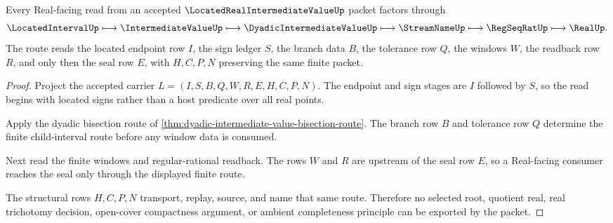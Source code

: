 \begin{theorem}
\label{thm:located-real-intermediate-value-sign-branch-route}
Every Real-facing read from an accepted $\LocatedRealIntermediateValueUp$ packet factors through
$$
\LocatedIntervalUp \longmapsto \IntermediateValueUp \longmapsto \DyadicIntermediateValueUp \longmapsto \StreamNameUp \longmapsto \RegSeqRatUp \longmapsto \RealUp .
$$
The route reads the located endpoint row $I$, the sign ledger $S$, the branch data $B$, the tolerance row $Q$, the windows $W$, the readback row $R$, and only then the seal row $E$, with $H,C,P,N$ preserving the same finite packet.
\end{theorem}
\begin{proof}
Project the accepted carrier $L=(I,S,B,Q,W,R,E,H,C,P,N)$. The endpoint and sign stages are $I$ followed by $S$, so the read begins with located signs rather than a host predicate over all real points.

Apply the dyadic bisection route of \autoref{thm:dyadic-intermediate-value-bisection-route}. The branch row $B$ and tolerance row $Q$ determine the finite child-interval route before any window data is consumed.

Next read the finite windows and regular-rational readback. The rows $W$ and $R$ are upstream of the seal row $E$, so a Real-facing consumer reaches the seal only through the displayed finite route.

The structural rows $H,C,P,N$ transport, replay, source, and name that same route. Therefore no selected root, quotient real, real trichotomy decision, open-cover compactness argument, or ambient completeness principle can be exported by the packet.
\end{proof}


\begin{closurestatus}{\LocatedRealIntermediateValueUp}
  \theoryclosure{\seedClosure}
  \formalstatus{\unformalizedV}
\end{closurestatus}
